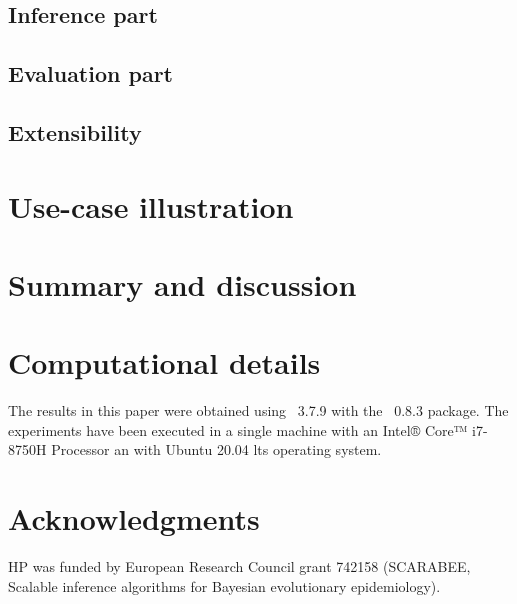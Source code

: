 \documentclass[article]{jss}
\begin{document}
\subsection{Inference part}
\label{subsec:inference}


\subsection{Evaluation part}
\label{subsec:evaluation}


\subsection{Extensibility} %
\label{subsec:extensibility}


\section{Use-case illustration}


\section{Summary and discussion} \label{sec:summary}



\section*{Computational details}

The results in this paper were obtained using ~3.7.9
with the ~0.8.3 package. The experiments have been executed
in a single machine with an Intel® Core™ i7-8750H Processor an with
Ubuntu 20.04 lts operating system.

\section*{Acknowledgments}

HP was funded by European Research Council grant 742158 (SCARABEE,
Scalable inference algorithms for Bayesian evolutionary epidemiology).

\clearpage


\end{document}
